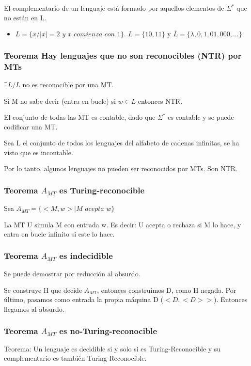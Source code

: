 El complementario de un lenguaje está formado por aquellos elementos de $\Sigma^*$ que no están en L.
\begin{itemize}
    \item $L=\{x/|x|=2 \textit{ y x comienza con 1}\}$. $L=\{10,11\}$ y $\overline{L}=\{\lambda, 0, 1, 01, 000, ... \}$
\end{itemize}

\subsubsection{Teorema Hay lenguajes que no son reconocibles (NTR) por MTs}
$\exists L / L$ no es reconocible por una MT.

Si M no sabe decir (entra en bucle) si $w \in L$ entonces NTR.

El conjunto de todas las MT es contable, dado que $\Sigma^*$ es contable y se puede codificar una MT. 

Sea L el conjunto de todos los lenguajes del alfabeto de cadenas infinitas, se ha visto que es incontable.

Por lo tanto, algunos lenguajes no pueden ser reconocidos por MTs. Son NTR.

\subsubsection{Teorema $A_{MT}$ es Turing-reconocible}
Sea $A_{MT}=\{<M,w> | M \textit{ acepta }w\}$

La MT U simula M con entrada w. Es decir: U acepta o rechaza si M lo hace, y entra en bucle infinito si este lo hace.

\subsubsection{Teorema $A_{MT}$ es indecidible}
Se puede demostrar por reducción al absurdo.

Se construye H que decide $A_{MT}$, entonces construimos D, como H negada. Por último, pasamos como entrada la propia máquina D ($<D, <D>>$). Entonces llegamos al absurdo.

\subsubsection{Teorema $\overline{A_{MT}}$ es no-Turing-reconocible}
Teorema: Un lenguaje es decidible si y solo si es Turing-Reconocible y su complementario es también Turing-Reconocible.

